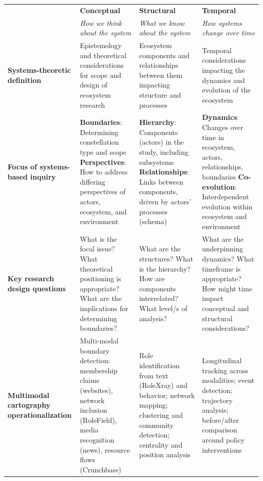 \documentclass[../main.tex]{subfiles}
\begin{document}
\begin{wideblock}
\tableminimal
\begin{center}
\small
\begin{tabular}{@{}p{2.2cm}p{3.8cm}p{3.8cm}p{3.8cm}@{}}
\toprule
 & \textbf{Conceptual} & \textbf{Structural} & \textbf{Temporal} \\
 & \textit{How we think about the system} & \textit{What we know about the system} & \textit{How systems change over time} \\
\midrule
\textbf{Systems-theoretic definition} &
Epistemology and theoretical considerations for scope and design of ecosystem research &
Ecosystem components and relationships between them impacting structure and processes &
Temporal considerations impacting the dynamics and evolution of the ecosystem \\
\addlinespace
\textbf{Focus of systems-based inquiry} &
\textbf{Boundaries}: Determining constellation type and scope \newline
\textbf{Perspectives}: How to address differing perspectives of actors, ecosystem, and environment &
\textbf{Hierarchy}: Components (actors) in the study, including subsystems \newline
\textbf{Relationships}: Links between components, driven by actors' processes (schema) &
\textbf{Dynamics}: Changes over time in ecosystem, actors, relationships, boundaries \newline
\textbf{Co-evolution}: Interdependent evolution within ecosystem and environment \\
\addlinespace
\textbf{Key research design questions} &
What is the focal issue? What theoretical positioning is appropriate? What are the implications for determining boundaries? &
What are the structures? What is the hierarchy? How are components interrelated? What level/s of analysis? &
What are the underpinning dynamics? What timeframe is appropriate? How might time impact conceptual and structural considerations? \\
\addlinespace
\textbf{Multimodal cartography operationalization} &
Multi-modal boundary detection: membership claims (websites), network inclusion (RoleField), media recognition (news), resource flows (Crunchbase) &
Role identification from text (RoleXray) and behavior; network mapping; clustering and community detection; centrality and position analysis &
Longitudinal tracking across modalities; event detection; trajectory analysis; before/after comparison around policy interventions \\

\end{tabular}
\end{center}
\end{wideblock}
\end{document}
